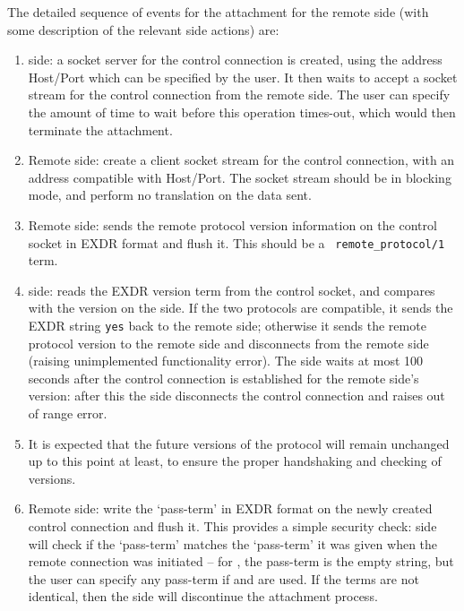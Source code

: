 The detailed sequence of events for the attachment for the remote side
(with some description of the relevant {\eclipse} side actions) are:

\begin{enumerate}
\item {\eclipse} side: a socket server for the control connection is
created, using the address Host/Port which can be specified by the
user. It then waits to accept a socket stream for the control connection
from the remote side. The user can specify the amount of time to wait
before this operation times-out, which would then terminate the attachment.

\item Remote side: create a client socket stream for the control connection,
with an address compatible with Host/Port. The socket stream should
be in blocking mode, and perform no translation on the data sent.
\item Remote side: sends the remote protocol version information on the
control socket in EXDR format and flush it. This should be a {\tt
remote_protocol/1} term. 
\item {\eclipse} side: reads the EXDR version term from the control
socket, and compares with the version on the {\eclipse} side. If the two
protocols are compatible, it sends the EXDR string {\tt yes} back to
the remote side; otherwise it sends the {\eclipse} remote protocol version
to the remote side and disconnects from the remote side (raising
unimplemented functionality error). The {\eclipse} side waits at
most 100 seconds after the control connection is established for the remote side's version: after
this the {\eclipse} side disconnects the control connection and raises out
of range error. 
\item It is expected that the future versions of the protocol will remain
unchanged up to this point at least, to ensure the proper handshaking and
checking of versions.
\item Remote side: write the `pass-term' in EXDR format on the newly created control
connection and flush it. This provides a simple security check: {\eclipse}
side will check if the `pass-term' matches the `pass-term' it was given
when the remote connection was initiated -- for , the
pass-term is the empty string, but the user can specify any pass-term if
 and  are
used. If the terms are not identical, then the {\eclipse} side will
discontinue the attachment process.


\end{enumerate}
